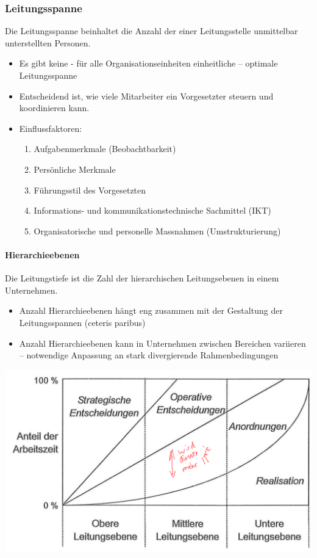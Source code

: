 \subsubsection{Leitungsspanne}
Die Leitungsspanne beinhaltet die Anzahl der einer Leitungsstelle unmittelbar unterstellten Personen.
\begin{itemize}
	\item Es gibt keine - für alle Organisationseinheiten einheitliche – optimale Leitungsspanne
	\item Entscheidend ist, wie viele Mitarbeiter ein Vorgesetzter steuern und koordinieren kann.
	\item Einflussfaktoren:
	\begin{enumerate}
		\item Aufgabenmerkmale (Beobachtbarkeit)
		\item Persönliche Merkmale
		\item Führungsstil des Vorgesetzten
		\item Informations- und kommunikationstechnische Sachmittel (IKT)
		\item Organisatorische und personelle Massnahmen (Umstrukturierung)
	\end{enumerate}
\end{itemize}

\paragraph{Hierarchieebenen}
Die Leitungstiefe ist die Zahl der hierarchischen Leitungsebenen in einem Unternehmen.
\begin{itemize}
	\item Anzahl Hierarchieebenen hängt eng zusammen mit der Gestaltung der Leitungsspannen (ceteris paribus)
	\item Anzahl Hierarchieebenen kann in Unternehmen zwischen Bereichen variieren – notwendige Anpassung an stark divergierende Rahmenbedingungen
\end{itemize}
\includegraphics[width=0.4\linewidth]{images/leitungsebenen}

